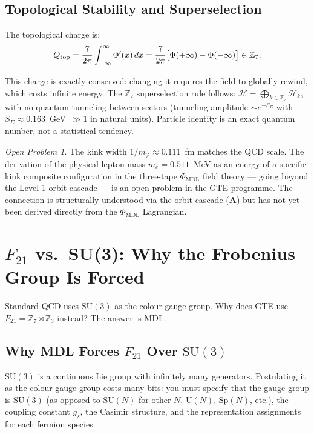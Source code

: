 \documentclass[11pt,openany]{book}
\theoremstyle{remark}
\newtheorem{openprob}{Open Problem}[chapter]
\newcommand{\PHIMDL}{\Phi_{\mathrm{MDL}}}
\newcommand{\ZS}{\mathbb{Z}_7}
\newcommand{\CatA}{\textbf{A}}
\begin{document}
\subsection*{Topological Stability and Superselection}

The topological charge is:
\[
Q_{\rm top} = \frac{7}{2\pi}\int_{-\infty}^{\infty}\Phi'(x)\,dx
= \frac{7}{2\pi}\bigl[\Phi(+\infty)-\Phi(-\infty)\bigr] \in \mathbb{Z}_7.
\]

This charge is exactly conserved: changing it requires the field to globally
rewind, which costs infinite energy.
The $\ZS$ superselection rule follows:
$\mathcal{H} = \bigoplus_{k\in\mathbb{Z}_7}\mathcal{H}_k$,
with no quantum tunneling between sectors
(tunneling amplitude $\sim e^{-S_E}$ with $S_E\approx 0.163$~GeV~$\gg 1$ in natural units).
Particle identity is an exact quantum number, not a statistical tendency.

\begin{openprob}
The kink width $1/m_\varphi \approx 0.111$~fm matches the QCD scale.
The derivation of the physical lepton mass $m_e = 0.511$~MeV as an energy of a specific
kink composite configuration in the three-tape $\PHIMDL$ field theory
--- going beyond the Level-1 orbit cascade --- is an open problem in the GTE programme.
The connection is structurally understood via the orbit cascade (\CatA) but has not
yet been derived directly from the $\PHIMDL$ Lagrangian.
\end{openprob}

\section{$F_{21}$ vs.\ SU(3): Why the Frobenius Group Is Forced}
\label{sec:f21}

Standard QCD uses $\mathrm{SU}(3)$ as the colour gauge group.
Why does GTE use $F_{21} = \ZS\rtimes\mathbb{Z}_3$ instead?
The answer is MDL.

\subsection*{Why MDL Forces $F_{21}$ Over $\mathrm{SU}(3)$}

$\mathrm{SU}(3)$ is a continuous Lie group with infinitely many generators.
Postulating it as the colour gauge group costs many bits: you must specify that the
gauge group is $\mathrm{SU}(3)$ (as opposed to $\mathrm{SU}(N)$ for other $N$,
$\mathrm{U}(N)$, $\mathrm{Sp}(N)$, etc.), the coupling constant $g_s$, the
Casimir structure, and the representation assignments for each fermion species.
\end{document}
